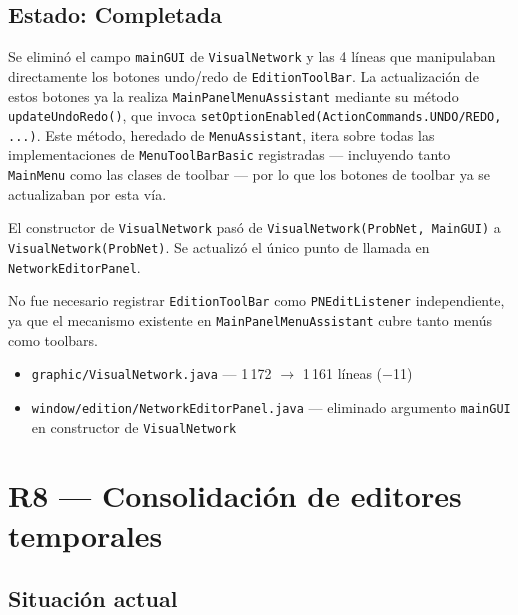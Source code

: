 \documentclass[12pt,a4paper]{article}
\newcommand{\code}[1]{\texttt{#1}}
\newcommand{\clase}[1]{\texttt{#1}}
\begin{document}
\subsection{Estado: Completada}

Se eliminó el campo \code{mainGUI} de \clase{VisualNetwork} y las 4
líneas que manipulaban directamente los botones undo/redo de
\clase{EditionToolBar}. La actualización de estos botones ya la realiza
\clase{MainPanelMenuAssistant} mediante su método
\code{updateUndoRedo()}, que invoca
\code{setOptionEnabled(ActionCommands.UNDO/REDO, ...)}. Este método,
heredado de \clase{MenuAssistant}, itera sobre todas las
implementaciones de \code{MenuToolBarBasic} registradas --- incluyendo
tanto \clase{MainMenu} como las clases de toolbar --- por lo que los
botones de toolbar ya se actualizaban por esta vía.

El constructor de \clase{VisualNetwork} pasó de
\code{VisualNetwork(ProbNet, MainGUI)} a \code{VisualNetwork(ProbNet)}.
Se actualizó el único punto de llamada en \clase{NetworkEditorPanel}.

No fue necesario registrar \clase{EditionToolBar} como
\code{PNEditListener} independiente, ya que el mecanismo existente en
\clase{MainPanelMenuAssistant} cubre tanto menús como toolbars.

\begin{itemize}[nosep]
  \item \code{graphic/VisualNetwork.java} --- 1\,172 $\to$ 1\,161 líneas ($-$11)
  \item \code{window/edition/NetworkEditorPanel.java} --- eliminado argumento
        \code{mainGUI} en constructor de \clase{VisualNetwork}
\end{itemize}

\section{R8 --- Consolidación de editores temporales}
\label{sec:r8}

\subsection{Situación actual}
\end{document}

